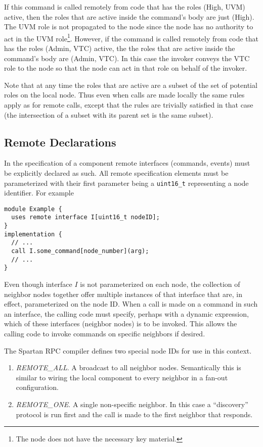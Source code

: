 If this command is called remotely from code that has the roles (High, UVM) active, then the
roles that are active inside the command's body are just (High). The UVM role is not propagated
to the node since the node has no authority to act in the UVM role\footnote{The node does not
have the necessary key material.}. However, if the command is called remotely from code that has
the roles (Admin, VTC) active, the the roles that are active inside the command's body are
(Admin, VTC). In this case the invoker conveys the VTC role to the node so that the node can act
in that role on behalf of the invoker.

Note that at any time the roles that are active are a subset of the set of potential roles on
the local node. Thus even when calls are made locally the same rules apply as for remote calls,
except that the rules are trivially satisfied in that case (the intersection of a subset with
its parent set is the same subset).

\subsection{Remote Declarations}

In the specification of a component remote interfaces (commands, events) must be explicitly
declared as such. All remote specification elements must be parameterized with their first
parameter being a \texttt{uint16\_t} representing a node identifier. For example
\begin{verbatim}
module Example {
  uses remote interface I[uint16_t nodeID];
}
implementation {
  // ...
  call I.some_command[node_number](arg);
  // ...
}
\end{verbatim}

Even though interface $I$ is not parameterized on each node, the collection of neighbor nodes
together offer multiple instances of that interface that are, in effect, parameterized on the
node ID. When a call is made on a command in such an interface, the calling code must specify,
perhaps with a dynamic expression, which of these interfaces (neighbor nodes) is to be invoked.
This allows the calling code to invoke commands on specific neighbors if desired.

The Spartan RPC compiler defines two special node IDs for use in this context.
\begin{enumerate}
\item \textit{REMOTE\_ALL}. A broadcast to all neighbor nodes. Semantically this is
similar to wiring the local component to every neighbor in a fan-out configuration.
\item \textit{REMOTE\_ONE}. A single non-specific neighbor. In this case a ``discovery''
protocol is run first and the call is made to the first neighbor that responds.
\end{enumerate}

